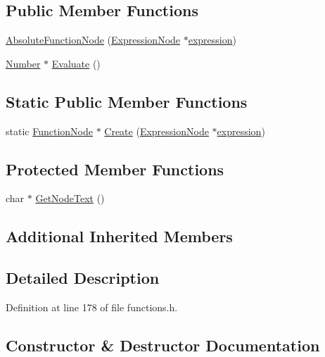 \subsection*{Public Member Functions}
\begin{DoxyCompactItemize}
\item 
\hyperlink{classAbsoluteFunctionNode_adcc843140de3a7435546a293b9b5b882}{Absolute\+Function\+Node} (\hyperlink{classExpressionNode}{Expression\+Node} $\ast$\hyperlink{classFunctionNode_ad7577b179a1937aaf8a0058bb5b546dc}{expression})
\item 
\hyperlink{structNumber}{Number} $\ast$ \hyperlink{classAbsoluteFunctionNode_addd9710c60598aca391822e25d67ab33}{Evaluate} ()
\end{DoxyCompactItemize}
\subsection*{Static Public Member Functions}
\begin{DoxyCompactItemize}
\item 
static \hyperlink{classFunctionNode}{Function\+Node} $\ast$ \hyperlink{classAbsoluteFunctionNode_a9da4bc82d15f41aaf9adde83974af83d}{Create} (\hyperlink{classExpressionNode}{Expression\+Node} $\ast$\hyperlink{classFunctionNode_ad7577b179a1937aaf8a0058bb5b546dc}{expression})
\end{DoxyCompactItemize}
\subsection*{Protected Member Functions}
\begin{DoxyCompactItemize}
\item 
char $\ast$ \hyperlink{classAbsoluteFunctionNode_a4cfc007fc3a4280fc294e04668aae566}{Get\+Node\+Text} ()
\end{DoxyCompactItemize}
\subsection*{Additional Inherited Members}


\subsection{Detailed Description}


Definition at line 178 of file functions.\+h.



\subsection{Constructor \& Destructor Documentation}
